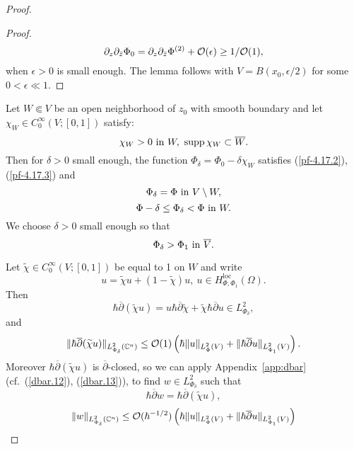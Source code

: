 \documentclass{article}
\newcommand{\CM}{\mathbb{C}}
\newcommand{\h}{\hbar}
\begin{document}
\begin{proof}
\begin{proof}
\begin{equation}
      \partial _z\partial _{\bar{z}}\Phi _0=\partial _z\partial
      _{\bar{z}}\Phi ^{(2)}+{\cal O}(\epsilon )\ge 1/{\cal O}(1),
    \end{equation}
    when $\epsilon >0$ is small enough. The lemma follows with
    $V=B(x_0,\epsilon /2)$ for some $0<\epsilon \ll 1$.
  \end{proof}
  Let $W\Subset V$ be an open neighborhood of $z_0$ with smooth
  boundary and let $\chi _W\in C_0^\infty (V;[0,1])$ satisfy:
  \begin{equation}\label{pf-4.17.9}
    \chi _W>0 \hbox{ in }W,\ \mathrm{supp\,}\chi _{W}\subset \overline{W}.
  \end{equation}
  Then for $\delta >0$ small enough, the function
  $\Phi _\delta =\Phi _0-\delta \chi _W$ satisfies (\ref{pf-4.17.2}),
  (\ref{pf-4.17.3}) and
  \begin{equation}\label{pf-4.17.10}
    \Phi _\delta =\Phi \hbox{ in }V\setminus W,
  \end{equation}
  \begin{equation}\label{pf-4.17.11}
    \Phi -\delta \le \Phi _\delta <\Phi \hbox{ in }W.
  \end{equation}
  We choose $\delta >0$ small enough so that
  \begin{equation}\label{pf-4.17.12}
    \Phi _\delta >\Phi _1 \hbox{ in }\overline{V}.
  \end{equation}

  \par Let $\widetilde{\chi }\in C_0^\infty (V;[0,1])$ be equal to 1
  on $W$ and write
  \begin{equation}\label{pf-4.17.13}
    u=\widetilde{\chi }u+(1-\widetilde{\chi })u,\ u\in
    H^{\mathrm{loc}}_{\Phi ,\Phi _1}(\Omega ).
  \end{equation}
  Then
  \begin{equation}\label{pf-4.17.14}
    \h \overline{\partial }(\widetilde{\chi }u)=u\h \overline{\partial
    }\widetilde{\chi }+\widetilde{\chi }\h \overline{\partial }u\in
    L^2_{\Phi _\delta },
  \end{equation}
  and
  \begin{equation}\label{pf-4.17.15}
    \| \h \overline{\partial } (\widetilde{\chi }u)\|_{L^2_{\Phi _\delta
      }(\CM^n)}\le {\cal O}(1)\left( \h \| u\|_{L^2_\Phi (V)}+\|
      \h \overline{\partial }u \|_{L^2_{\Phi _1}(V)} \right).
  \end{equation}
  Moreover $\h \overline{\partial }(\widetilde{\chi }u)$ is
  $\overline{\partial }$-closed, so we can apply
  Appendix~\ref{app:dbar} (cf.\ (\ref{dbar.12}), (\ref{dbar.13})), to
  find $w\in L^2_{\Phi _\delta }$ such that
  \begin{equation}\label{pf-4.17.16}
    \h \overline{\partial }w=\h \overline{\partial }(\widetilde{\chi }u),
  \end{equation}
  \begin{equation}\label{pf-4.17.17}
    \| w\|_{L^2_{\Phi _\delta }(\CM^n)}\le {\cal O}(\h ^{-1/2})\left( \h \| u\|_{L^2_\Phi (V)}+\|
      \h \overline{\partial }u \|_{L^2_{\Phi _1}(V)} \right)
  \end{equation}


\end{proof}
\end{document}
